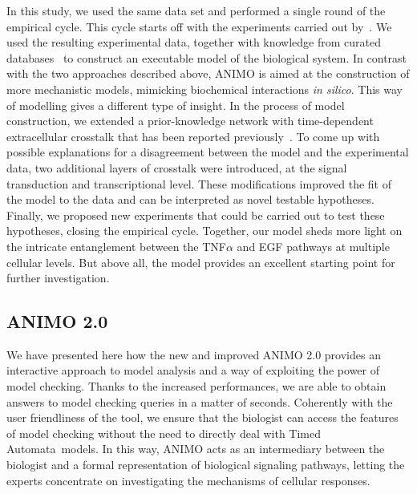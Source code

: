 \documentclass{bmcart}
\def\tas{Timed Automata}
\begin{document}
In this study, we used the same data set and performed a single round of the empirical cycle.
This cycle starts off with the experiments carried out by~\cite{pathway-compendium}. We used the
resulting experimental data, together with knowledge from curated databases~\cite{kegg,phosphosite}
to construct an executable model of the biological system.
In contrast with the two approaches described above, ANIMO is aimed at the construction of
more mechanistic models, mimicking biochemical interactions \emph{in silico}. This way of modelling
gives a different type of insight. In the process of model construction, we extended a
prior-knowledge network with time-dependent extracellular crosstalk that has been reported
previously~\cite{pathway-autocrine}. To come up with possible explanations for a disagreement
between the model and the experimental data, two additional layers of
crosstalk were introduced, at the signal transduction and transcriptional level. These modifications 
improved the fit of the model to the data and can be interpreted as novel testable hypotheses.
Finally, we proposed new experiments that could be carried out to test these hypotheses, closing the empirical cycle. 
Together, our model sheds more light on the intricate
entanglement between the TNF$\alpha$ and EGF pathways at multiple cellular levels.
But above all,  the model provides an excellent starting point for further investigation.


\subsection*{ANIMO 2.0}
We have presented here how the new and improved ANIMO 2.0 
provides an interactive approach to model analysis and a way of exploiting the power of model checking.
Thanks to the increased performances,
we are able to obtain answers to model checking queries in a matter of seconds.
Coherently with the user friendliness of the tool, we ensure that the biologist can access the features
of model checking without the need to directly deal with \tas\ models.
In this way, ANIMO acts as an intermediary between the biologist and a formal
representation of biological signaling pathways, letting the experts concentrate
on investigating the mechanisms of cellular responses.
\end{document}
